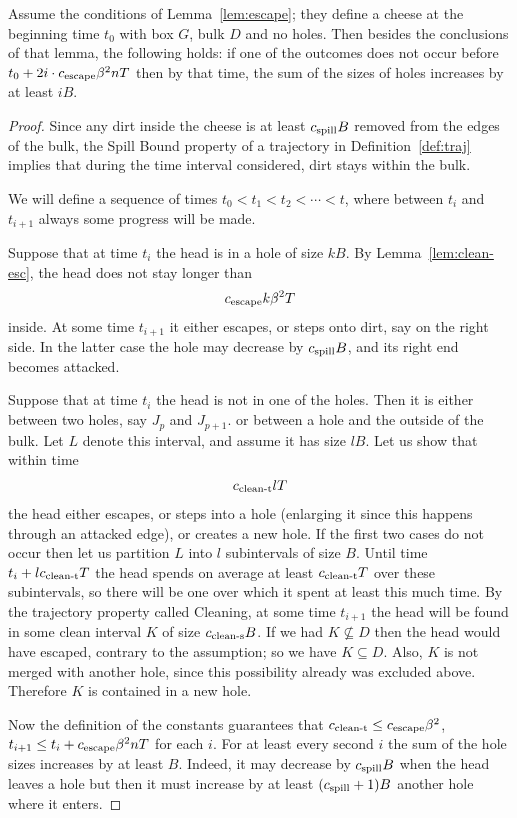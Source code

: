 \documentclass[12pt]{memoir}
\renewcommand{\le}{\leq}
\def\B{B}
\def\G{G}
\newcommand{\Tu}{T}
\newcommand{\cns}[1]{c_{\textrm{\upshape #1}}}
\newcommand{\cEsc}{\cns{escape}}
\newcommand{\cCleanS}{\cns{clean-s}}
\newcommand{\cCleanT}{\cns{clean-t}}
\newcommand{\cSpill}{\cns{spill}}
\begin{document}
\begin{lemma}\label{lem:partial-escape}
Assume the conditions of Lemma~\ref{lem:escape};
they define a cheese at the beginning time \( t_{0} \) 
with box \( \G \), bulk \( D \) and no holes.
Then besides the conclusions of that lemma, the following holds:
if one of the outcomes does not occur before 
\( t_{0}+ 2i\cdot\cEsc \beta^{2}n\Tu \) 
then by that time, the sum of the sizes of holes increases by at least \( i\B \).
\end{lemma}
  \begin{proof}
Since any dirt inside the cheese is at least \( \cSpill \B \) removed from the edges 
of the bulk,
the Spill Bound property of a trajectory in Definition~\ref{def:traj} implies
that during the time interval considered, dirt stays within the bulk.

We will define a sequence of times \( t_{0}<t_{1}<t_{2}<\dotsm<t \),
where between \( t_{i} \) and \( t_{i+1} \) always some progress will be made.

Suppose that at time \( t_{i} \) the head is in a hole of size \( k\B \).
By Lemma~\ref{lem:clean-esc}, the head does not stay longer than
\begin{align*}
\cEsc k\beta^{2}\Tu
 \end{align*}
inside.
At some time \( t_{i+1} \) it either escapes, or steps onto dirt, say on the right side. 
In the latter case the hole may decrease by \( \cSpill\B \), and its right end becomes attacked.

Suppose that at time \( t_{i} \) the head is not in one of the holes.
Then it is either between two holes, say \( J_{p} \) and \( J_{p+1} \).
or between a hole and the outside of the bulk.
Let \( L \) denote this interval, and assume it has size \( l\B \).
Let us show that within time
 \begin{align*}
   \cCleanT l \Tu
 \end{align*}
the head either escapes, or steps into a hole (enlarging it since this happens through
an attacked edge), or creates a new hole.
If the first two cases do not occur then
let us partition \( L \) into \( l \) subintervals of size \( \B \).
Until time \( t_{i}+l\cCleanT\Tu \) the head spends on average at least
\( \cCleanT \Tu \) over these subintervals,  so 
there will be one over which it spent at least this much time.
By the trajectory property called Cleaning, 
at some time \( t_{i+1} \) the head will be found in some clean
interval \( K \) of size \( \cCleanS \B \).
If we had \( K\not\subseteq D \) then the head would have escaped, 
contrary to the assumption; so we have \( K\subseteq D \).
Also, \( K \) is not merged with another hole, since this
possibility already was excluded above.
Therefore \( K \) is contained in a new hole.

Now the definition of the constants guarantees that \( \cCleanT \le \cEsc\beta^{2} \),
\( t_{i+1}\le t_{i}+\cEsc \beta^{2}n\Tu \) 
for each \( i \).
For at least every second \( i \) the sum of the hole sizes increases by at least \( \B \).
Indeed, it may decrease by \( \cSpill\B \) when the head leaves a hole but then it must
increase by at least \( (\cSpill+1)\B \) another hole where it enters.
 \end{proof}
\end{document}
